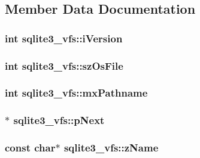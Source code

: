 \subsection{Member Data Documentation}
\hypertarget{structsqlite3__vfs_694dd264949bd163545fe174510ed019}{
\subsubsection[iVersion]{\setlength{\rightskip}{0pt plus 5cm}int {\bf sqlite3\_\-vfs::iVersion}}}
\label{structsqlite3__vfs_694dd264949bd163545fe174510ed019}


\hypertarget{structsqlite3__vfs_549399081342d61134b6398562a0a997}{
\subsubsection[szOsFile]{\setlength{\rightskip}{0pt plus 5cm}int {\bf sqlite3\_\-vfs::szOsFile}}}
\label{structsqlite3__vfs_549399081342d61134b6398562a0a997}


\hypertarget{structsqlite3__vfs_db2d82c74891b00b5529fb94e7710135}{
\subsubsection[mxPathname]{\setlength{\rightskip}{0pt plus 5cm}int {\bf sqlite3\_\-vfs::mxPathname}}}
\label{structsqlite3__vfs_db2d82c74891b00b5529fb94e7710135}


\hypertarget{structsqlite3__vfs_e795a4417697ecd35163f6cdf0069073}{
\subsubsection[pNext]{$\ast$ {\bf sqlite3\_\-vfs::pNext}}}
\label{structsqlite3__vfs_e795a4417697ecd35163f6cdf0069073}


\hypertarget{structsqlite3__vfs_0f06a27ac2201ea04c0623ef19e5d73e}{
\subsubsection[zName]{\setlength{\rightskip}{0pt plus 5cm}const char$\ast$ {\bf sqlite3\_\-vfs::zName}}}
\label{structsqlite3__vfs_0f06a27ac2201ea04c0623ef19e5d73e}


